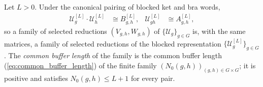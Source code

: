 \begin{definition}
    \label{def:mpug_pair_reductions_block}
    \leanok
    Let $L>0$.  Under the canonical pairing of blocked ket and bra words,
    \begin{align}
        \mathcal U_g^{[L]}\mathbin{\cdot}\mathcal U_h^{[L]}
         & \cong B_{g,h}^{[L]},
         & \mathcal U_{gh}^{[L]}
         & \cong A_{g,h}^{[L]},
        \label{eq:mpug_pair_tensors_block}
    \end{align}
    so a family of selected reductions $(V_{g,h},W_{g,h})$ of
    $\{\mathcal U_g\}_{g\in G}$ is, with the same matrices, a family of
    selected reductions of the blocked representation
    $\{\mathcal U_g^{[L]}\}_{g\in G}$.  The \emph{common buffer length} of
    the family is the common buffer length (\ref{eq:common_buffer_length})
    of the finite family $(N_0(g,h))_{(g,h)\in G\times G}$; it is positive
    and satisfies $N_0(g,h)\leq L+1$ for every pair.
\end{definition}

